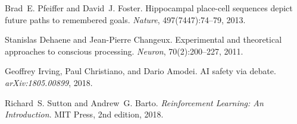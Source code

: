 \documentclass[11pt]{article}
\newcommand{\1}{\mathbb{I}}
\begin{document}
\begin{thebibliography}{10}
Brad~E. Pfeiffer and David~J. Foster.
\newblock Hippocampal place-cell sequences depict future paths to remembered goals.
\newblock \emph{Nature}, 497(7447):74--79, 2013.

Stanislas Dehaene and Jean-Pierre Changeux.
\newblock Experimental and theoretical approaches to conscious processing.
\newblock \emph{Neuron}, 70(2):200--227, 2011.

Geoffrey Irving, Paul Christiano, and Dario Amodei.
\newblock AI safety via debate.
\newblock \emph{arXiv:1805.00899}, 2018.

Richard~S. Sutton and Andrew~G. Barto.
\newblock \emph{Reinforcement Learning: An Introduction}.
\newblock MIT Press, 2nd edition, 2018.

\end{thebibliography}
\end{document}
